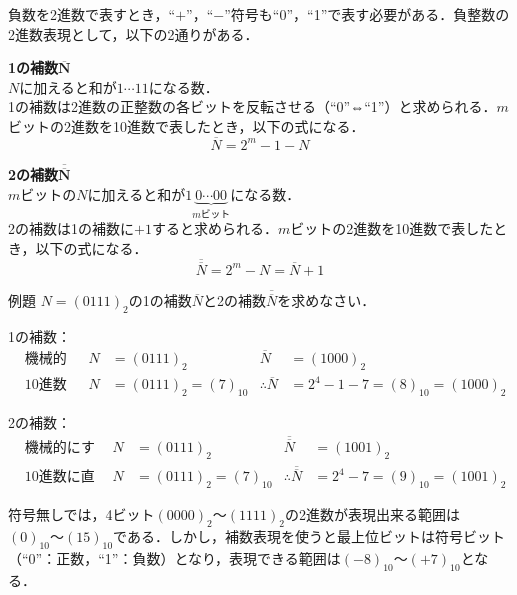 負数を2進数で表すとき，“$+$”，“$-$”符号も“0”，“1”で表す必要がある．負整数の2進数表現として，以下の2通りがある．

\begin{enumerate}[label=\textbf{[\arabic*]}, labelsep=10pt, leftmargin=23pt]
	\item \textbf{1の補数$\bm{\overline{N}}$}\\
		$N$に加えると和が$1\cdots 11$になる数．\\
		1の補数は2進数の正整数の各ビットを反転させる（“0”⇔“1”）と求められる．$m$ビットの2進数を10進数で表したとき，以下の式になる．
		\begin{equation}
			\overline{N} = 2^m - 1 - N
		\end{equation}
	\item \textbf{2の補数$\bm{\overline{\overline{N}}}$}\\
		$m$ビットの$N$に加えると和が$1\underbrace{0\cdots 00}_{\text{$m$ビット}}$になる数．\\
		2の補数は1の補数に$+1$すると求められる．$m$ビットの2進数を10進数で表したとき，以下の式になる．
		\begin{equation}
			\overline{\overline{N}} = 2^m - N = \overline{N} + 1
		\end{equation}
\end{enumerate}

\begin{tip}{例題}
	\textsf{$N = (0111)_{2}$の1の補数$\overline{N}$と2の補数$\overline{\overline{N}}$を求めなさい．}

	\tcblower

	1の補数：
	\begin{align*}
		&\text{機械的にする場合} & N &= (0111)_{2} & \overline{N} &= (1000)_{2}\\
		&\text{10進数に直して考える場合} & N &= (0111)_{2} = (7)_{10} & \therefore \overline{N} &= 2^4 - 1 - 7 = (8)_{10} = (1000)_{2}
	\end{align*}

	2の補数：
	\begin{align*}
		&\text{機械的にする場合} & N &= (0111)_{2} & \overline{\overline{N}} &= (1001)_{2}\\
		&\text{10進数に直して考える場合} & N &= (0111)_{2} = (7)_{10} & \therefore \overline{\overline{N}} &= 2^4 - 7 = (9)_{10} = (1001)_{2}
	\end{align*}
\end{tip}

\newpage


符号無しでは，4ビット$(0000)_{2} ～ (1111)_{2}$の2進数が表現出来る範囲は$(0)_{10} ～ (15)_{10}$である．しかし，補数表現を使うと最上位ビットは符号ビット（“0”：正数，“1”：負数）となり，表現できる範囲は$(-8)_{10} ～ (+7)_{10}$となる．

